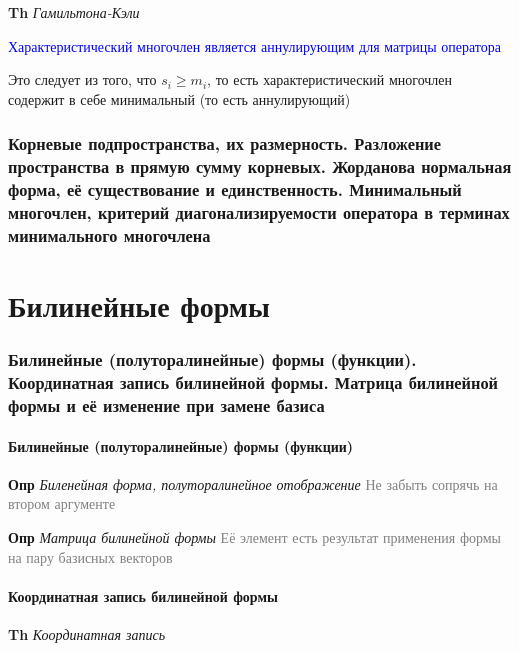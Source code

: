 \documentclass[a4paper, 14pt]{article}
\begin{document}
    \textbf{Th} \textit{Гамильтона-Кэли}
    
    \textcolor{blue}{Характеристический многочлен является аннулирующим для матрицы оператора}
    
    Это следует из того, что $s_i \geq m_i$, то есть характеристический многочлен содержит в себе минимальный (то
    есть аннулирующий)
    
    \section{Корневые подпространства, их размерность.
    Разложение пространства в прямую сумму корневых.
    Жорданова нормальная форма, её существование и единственность.
    Минимальный многочлен, критерий диагонализируемости оператора в терминах минимального многочлена}
    
    
    
     \part*{Билинейные формы}
    
    \section{Билинейные (полуторалинейные) формы (функции).
    Координатная запись билинейной формы.
    Матрица билинейной формы и её изменение при замене базиса}
    
    \subsection{Билинейные (полуторалинейные) формы (функции)}
    
    \textbf{Опр} \textit{Биленейная форма, полуторалинейное отображение} \textcolor{gray}{Не забыть сопрячь на втором
    аргументе}
    
    \textbf{Опр} \textit{Матрица билинейной формы} \textcolor{gray}{Её элемент есть результат применения формы на
    пару базисных векторов}
    
    \subsection{Координатная запись билинейной формы}
    
    \textbf{Th} \textit{Координатная запись}
    
\end{document}
